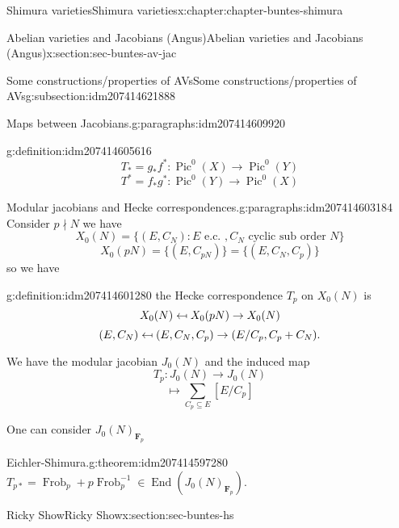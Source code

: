 \documentclass[oneside,10pt,]{book}
\numberwithin{equation}{section}
\newcommand{\inv}{^{-1}}
\providecommand\mapsfrom{\mathrel{\reflectbox{\ensuremath{\mapsto}}}}
\newcommand{\FF}{\mathbf{F}}
\DeclareMathOperator{\End}{End}
\DeclareMathOperator{\Pic}{Pic}
\DeclareMathOperator{\Frob}{Frob}
\begin{document}
\begin{chapterptx}{Shimura varieties}{}{Shimura varieties}{}{}{x:chapter:chapter-buntes-shimura}
\begin{sectionptx}{Abelian varieties and Jacobians (Angus)}{}{Abelian varieties and Jacobians (Angus)}{}{}{x:section:sec-buntes-av-jac}
\begin{subsectionptx}{Some constructions\slash{}properties of AVs}{}{Some constructions\slash{}properties of AVs}{}{}{g:subsection:idm207414621888}
\begin{paragraphs}{Maps between Jacobians.}{g:paragraphs:idm207414609920}
\begin{definition}{}{g:definition:idm207414605616}
\begin{equation*}
T_* = g_* f^* \colon \Pic^0(X) \to \Pic^0(Y)
\end{equation*}
%
\begin{equation*}
T^* = f_* g^* \colon \Pic^0(Y) \to \Pic^0(X)
\end{equation*}
%
\end{definition}
\end{paragraphs}%
\begin{paragraphs}{Modular jacobians and Hecke correspondences.}{g:paragraphs:idm207414603184}%
Consider \(p\nmid N\) we have%
\begin{equation*}
X_0(N) = \{ (E,C_N) : E\text{ e.c. }, C_N \text{ cyclic sub order } N\}
\end{equation*}
%
\begin{equation*}
X_0(pN) = \{(E,C_{pN})\} = \{(E,C_N,C_p)\}
\end{equation*}
so we have%
\begin{definition}{}{g:definition:idm207414601280}%
the Hecke correspondence \(T_p\) on \(X_0(N)\) is%
\begin{equation*}
X_0(N) \mapsfrom X_0(pN) \to X_0(N)
\end{equation*}
%
\begin{equation*}
(E,C_N)\mapsfrom (E,C_N,C_p)\to (E/C_p, C_p + C_N)\text{.}
\end{equation*}
%
\end{definition}
We have the modular jacobian \(J_0(N)\) and the induced map%
\begin{equation*}
T_p \colon J_0(N) \to J_0(N)
\end{equation*}
%
\begin{equation*}
[E] \mapsto \sum_{C_p \subseteq E} [E/C_p]
\end{equation*}
%
\par
One can consider \(J_0(N)_{\FF_p}\)%
\begin{theorem}{Eichler-Shimura.}{}{g:theorem:idm207414597280}%
\(T_{p*} = \Frob_p + p \Frob_p\inv \in \End(J_0(N)_{\FF_p})\).%
\end{theorem}
\end{paragraphs}%
\end{subsectionptx}
\end{sectionptx}
%
%
\typeout{************************************************}
\typeout{************************************************}
%
\begin{sectionptx}{Ricky Show}{}{Ricky Show}{}{}{x:section:sec-buntes-hs}
%
%
\typeout{************************************************}

\end{sectionptx}
\end{chapterptx}
\end{document}
